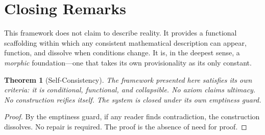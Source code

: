 \documentclass[12pt, oneside]{article}
\newtheorem{theorem}{Theorem}[section]
\begin{document}
\section{Closing Remarks}

This framework does not claim to describe reality. It provides a functional scaffolding within which any consistent mathematical description can appear, function, and dissolve when conditions change. It is, in the deepest sense, a \textit{morphic} foundation—one that takes its own provisionality as its only constant.

\begin{center}
\end{center}

\begin{theorem}[Self-Consistency]
The framework presented here satisfies its own criteria: it is conditional, functional, and collapsible. No axiom claims ultimacy. No construction reifies itself. The system is closed under its own emptiness guard.
\end{theorem}

\begin{proof}
By the emptiness guard, if any reader finds contradiction, the construction dissolves. No repair is required. The proof is the absence of need for proof.
\end{proof}
\end{document}
